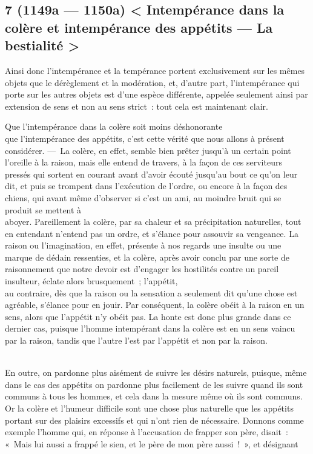 \documentclass[french,twoside]{book} %
\begin{document}
\subsection[{7 (1149a — 1150a) < Intempérance dans la colère et intempérance des appétits — La bestialité >}]{7 (1149a — 1150a) < Intempérance dans la colère et intempérance des appétits — La bestialité >}
\noindent Ainsi donc l’intempérance et la tempérance portent exclusivement sur les mêmes objets que le dérèglement et la modération, et, d’autre part, l’intempérance qui porte sur les autres objets est d’une espèce différente, appelée seulement ainsi par extension de sens et non au sens strict : tout cela est maintenant clair.\par
Que l’intempérance dans la colère soit moins déshonorante \\
que l’intempérance des appétits, c’est cette vérité que nous allons à présent considérer. — La colère, en effet, semble bien prêter jusqu’à un certain point l’oreille à la raison, mais elle entend de travers, à la façon de ces serviteurs pressés qui sortent en courant avant d’avoir écouté jusqu’au bout ce qu’on leur dit, et puis se trompent dans l’exécution de l’ordre, ou encore à la façon des chiens, qui avant même d’observer si c’est un ami, au moindre bruit qui se produit se mettent à \\
aboyer. Pareillement la colère, par sa chaleur et sa précipitation naturelles, tout en entendant n’entend pas un ordre, et s’élance pour assouvir sa vengeance. La raison ou l’imagination, en effet, présente à nos regards une insulte ou une marque de dédain ressenties, et la colère, après avoir conclu par une sorte de raisonnement que notre devoir est d’engager les hostilités contre un pareil insulteur, éclate alors brusquement ; l’appétit, \\
au contraire, dès que la raison ou la sensation a seulement dit  qu’une chose est agréable, s’élance pour en jouir. Par conséquent, la colère obéit à la raison en un sens, alors que l’appétit n’y obéit pas. La honte est donc plus grande dans ce dernier cas, puisque l’homme intempérant dans la colère est en un sens vaincu par la raison, tandis que l’autre l’est par l’appétit et non par la raison.\par
\\
En outre, on pardonne plus aisément de suivre les désirs naturels, puisque, même dans le cas des appétits on pardonne plus facilement de les suivre quand ils sont communs à tous les hommes, et cela dans la mesure même où ils sont communs. Or la colère et l’humeur difficile sont une chose plus naturelle que les appétits portant sur des plaisirs excessifs et qui n’ont rien de nécessaire. Donnons comme exemple l’homme qui, en réponse à l’accusation de frapper son père, disait : « Mais lui aussi a frappé le sien, et le père de mon père aussi ! », et désignant \\
\end{document}

